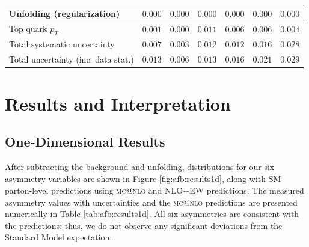 \begin{table}[!h]
\begin{center}
\begin{tabular}{l||r|r|r|r|r|r}
Unfolding (regularization)        & $0.000$   & $0.000$   & $0.000$   & $0.000$   & $0.000$   & $0.000$   \\
\hline
\hline
Top quark $p_T$                   & $0.001$   & $0.000$   & $0.011$   & $0.006$   & $0.006$   & $0.004$   \\
\hline
\hline
Total systematic uncertainty      & $0.007$   & $0.003$   & $0.012$   & $0.012$   & $0.016$   & $0.028$   \\
\hline
\hline
Total uncertainty (inc. data stat.) & $0.013$   & $0.006$   & $0.013$   & $0.016$   & $0.021$   & $0.029$   \\
\hline
\end{tabular}
\end{center}
\end{table}

\section{Results and Interpretation}
\label{sec:afb:results}

\subsection{One-Dimensional Results}
\label{ssec:afb:results1d}

After subtracting the background and unfolding, distributions for our
six asymmetry variables are shown in Figure \ref{fig:afb:results1d},
along with SM parton-level predictions using
\textsc{mc@nlo} and NLO+EW predictions. The
measured asymmetry values with uncertainties and the \textsc{mc@nlo}
predictions are presented numerically in Table
\ref{tab:afb:results1d}. All six asymmetries are consistent with the
predictions; thus, we do not observe any significant deviations from
the Standard Model expectation.

